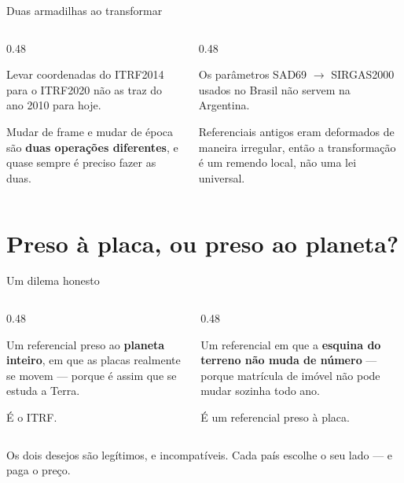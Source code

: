 \documentclass[aspectratio=169,11pt]{beamer}
\newcommand{\bnum}[1]{\textbf{\textcolor{mTeal}{#1}}}
\begin{document}
\begin{frame}{Duas armadilhas ao transformar}
  \begin{columns}[T]
    \begin{column}{0.48\textwidth}
      \begin{armadilha}[title={Transformar não muda a época}]
        Levar coordenadas do ITRF2014 para o ITRF2020 \alert{não} as traz do ano 2010 para
        hoje.
        \medskip

        Mudar de frame e mudar de época são \bnum{duas operações diferentes}, e quase sempre
        é preciso fazer as duas.
      \end{armadilha}
    \end{column}
    \begin{column}{0.48\textwidth}
      \begin{armadilha}[title={Parâmetros valem numa região}]
        Os parâmetros SAD69 $\to$ SIRGAS2000 usados no Brasil não servem na Argentina.
        \medskip

        Referenciais antigos eram \alert{deformados de maneira irregular}, então a
        transformação é um remendo local, não uma lei universal.
      \end{armadilha}
    \end{column}
  \end{columns}
\end{frame}

\section{Preso à placa, ou preso ao planeta?}

\begin{frame}{Um dilema honesto}
  \begin{columns}[T]
    \begin{column}{0.48\textwidth}
      \begin{ideia}[title={O que a ciência quer}]
        Um referencial preso ao \bnum{planeta inteiro}, em que as placas realmente se
        movem --- porque é assim que se estuda a Terra.
        \medskip

        É o ITRF.
      \end{ideia}
    \end{column}
    \begin{column}{0.48\textwidth}
      \begin{cuidado}[title={O que o cartório quer}]
        Um referencial em que a \bnum{esquina do terreno não muda de número} --- porque
        matrícula de imóvel não pode mudar sozinha todo ano.
        \medskip

        É um referencial preso à placa.
      \end{cuidado}
    \end{column}
  \end{columns}
  \bigskip
  \centering
  Os dois desejos são legítimos, e \alert{incompatíveis}. Cada país escolhe o seu lado ---
  e paga o preço.
\end{frame}
\end{document}
